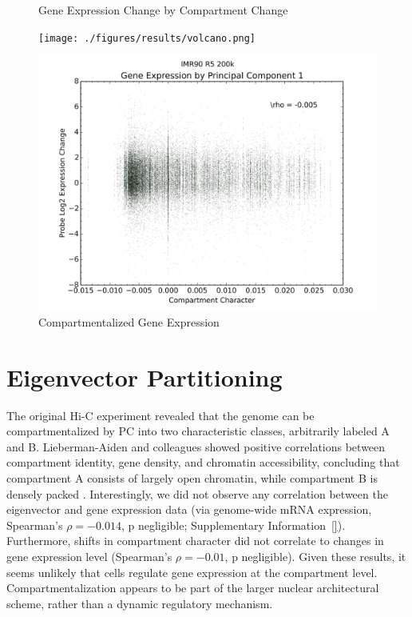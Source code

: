 \begin{figure}[thp]
  \begin{minipage}{0.45\textwidth}%
    \centering
    \caption{Gene Expression Change by Compartment Change}\label{fig:expressionChangeByCompartmentChange}
    \texttt{[image: ./figures/results/volcano.png]}
  \end{minipage}

  \begin{minipage}{0.45\textwidth}
    \centering
    \caption{Compartmentalized Gene Expression}\label{fig:expressionChangeByCompartment}
    \includegraphics[width=\textwidth]{./figures/results/compartment_ir5_200k.png}
  \end{minipage}
\end{figure}

\section*{Eigenvector Partitioning}

The original Hi-C experiment revealed that the genome can be compartmentalized by \gls{PC} into two characteristic classes, arbitrarily
labeled A and B.  Lieberman-Aiden and colleagues showed positive correlations between compartment identity, gene density, and chromatin
accessibility, concluding that compartment A consists of largely open chromatin, while compartment B is densely packed \citep{aiden2009}.
Interestingly, we did not observe any correlation between the eigenvector and gene expression data (via genome-wide mRNA expression,
Spearman's $\rho = -0.014$, p negligible; Supplementary Information~\ref{}).  Furthermore, shifts in compartment character did not correlate to
changes in gene expression level (Spearman's $\rho = -0.01$, p negligible).  Given these results, it seems unlikely that cells regulate
gene expression at the compartment level.  Compartmentalization appears to be part of the larger nuclear architectural scheme, rather than
a dynamic regulatory mechanism.


